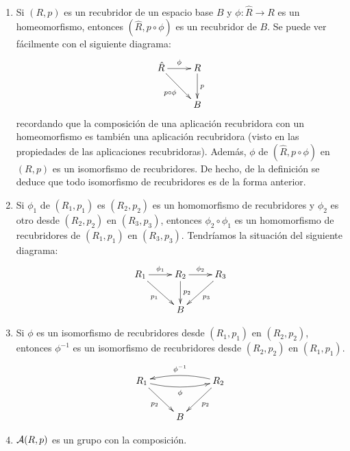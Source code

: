 \begin{observacion}\
    \begin{enumerate}
        \item Si $(R,p)$ es un recubridor de un espacio base $B$ y $\phi:\hat{R}\to R$ es un homeomorfismo, entonces $(\hat{R}, p\circ \phi)$ es un recubridor de $B$. Se puede ver fácilmente con el siguiente diagrama:
        \begin{gather*}
            \xymatrix{
                \hat{R} \ar[r]^{\phi} \ar[dr]_{p\circ \phi} & R \ar[d]^{p}\\
                & B
            }
        \end{gather*}
        recordando que la composición de una aplicación recubridora con un homeomorfismo es también una aplicación recubridora (visto en las propiedades de las aplicaciones recubridoras). Además, $\phi$ de $(\hat{R}, p\circ \phi)$ en $(R,p)$ es un isomorfismo de recubridores. De hecho, de la definición se deduce que todo isomorfismo de recubridores es de la forma anterior.

        \item Si $\phi_1$ de $(R_1,p_1)$ es $(R_2,p_2)$ es un homomorfismo de recubridores y $\phi_2$ es otro desde $(R_2,p_2)$ en $(R_3,p_3)$, entonces $\phi_2\circ \phi_1$ es un homomorfismo de recubridores de $(R_1,p_1)$ en $(R_3, p_3)$. Tendríamos la situación del siguiente diagrama:
        \begin{gather*}
            \xymatrix{
                R_1 \ar[dr]_{p_1} \ar[r]^{\phi_1} & R_2 \ar[d]^{p_2} \ar[r]^{\phi_2} & R_3 \ar[dl]^{p_3}\\
                & B 
            }
        \end{gather*}

        \item Si $\phi$ es un isomorfismo de recubridores desde $(R_1,p_1)$ en $(R_2,p_2)$, entonces $\phi^{-1}$ es un isomorfismo de recubridores desde $(R_2,p_2)$ en $(R_1,p_1)$.
        \begin{gather*}
            \xymatrix{
                R_1 \ar@/_/[rr]_{\phi} \ar[dr]_{p_2} && R_2 \ar@/_/[ll]_{\phi^{-1}} \ar[dl]^{p_2} \\
                & B
            }
        \end{gather*}

        \item $\mathcal{A}(R,p)$ es un grupo con la composición.
    \end{enumerate}
\end{observacion}


